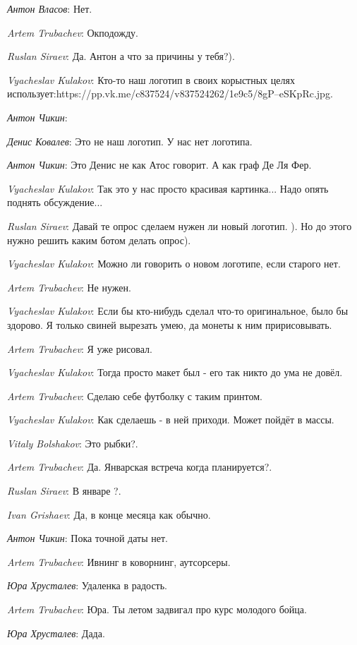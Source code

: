 \documentclass[10pt]{book}
\newcommand{\AUTHOR}[1]{\emph{#1}:}
\begin{document}
\AUTHOR{Антон Власов} Нет.

\AUTHOR{Artem Trubachev} Окподожду.

\AUTHOR{Ruslan Siraev} Да. Антон а что за причины у тебя?).

\AUTHOR{Vyacheslav Kulakov} Кто-то наш логотип в своих корыстных целях использует:https://pp.vk.me/c837524/v837524262/1e9c5/8gP--eSKpRc.jpg.

\AUTHOR{Антон Чикин}

\AUTHOR{Денис Ковалев} Это не наш логотип. У нас нет логотипа.

\AUTHOR{Антон Чикин} Это Денис не как Атос говорит. А как граф Де Ля Фер.

\AUTHOR{Vyacheslav Kulakov} Так это у нас просто красивая картинка... Надо опять поднять обсуждение...

\AUTHOR{Ruslan Siraev} Давай те опрос сделаем нужен ли новый логотип. ). Но до этого нужно решить каким ботом делать опрос).

\AUTHOR{Vyacheslav Kulakov} Можно ли говорить о новом логотипе, если старого нет.

\AUTHOR{Artem Trubachev} Не нужен.

\AUTHOR{Vyacheslav Kulakov} Если бы кто-нибудь сделал что-то оригинальное, было бы здорово. Я только свиней вырезать умею, да монеты к ним пририсовывать.

\AUTHOR{Artem Trubachev} Я уже рисовал.

\AUTHOR{Vyacheslav Kulakov} Тогда просто макет был - его так никто до ума не довёл.

\AUTHOR{Artem Trubachev} Сделаю себе футболку с таким принтом.

\AUTHOR{Vyacheslav Kulakov} Как сделаешь - в ней приходи. Может пойдёт в массы.

\AUTHOR{Vitaly Bolshakov} Это рыбки?.

\AUTHOR{Artem Trubachev} Да. Январская встреча когда планируется?.

\AUTHOR{Ruslan Siraev} В январе ?.

\AUTHOR{Ivan Grishaev} Да, в конце месяца как обычно.

\AUTHOR{Антон Чикин} Пока точной даты нет.

\AUTHOR{Artem Trubachev} Ивнинг в коворнинг, аутсорсеры.

\AUTHOR{Юра Хрусталев} Удаленка в радость.

\AUTHOR{Artem Trubachev} Юра. Ты летом задвигал про курс молодого бойца.

\AUTHOR{Юра Хрусталев} Дада.
\end{document}
